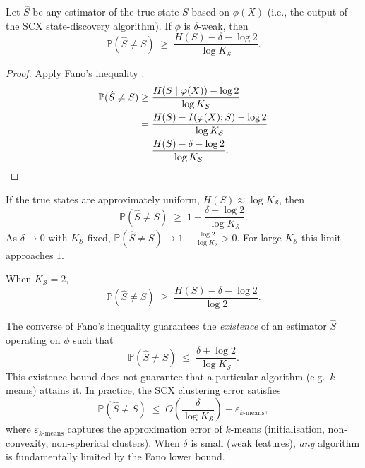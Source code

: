 \begin{lemma}
\label{lem:fano}
Let $\hat{S}$ be any estimator of the true state $S$ based on $\phi(X)$
(i.e., the output of the SCX state-discovery algorithm). If $\phi$ is
$\delta$-weak, then
\begin{equation}
\mathbb{P}(\hat{S} \neq S) \;\geq\;
\frac{H(S) - \delta - \log 2}{\log K_{\mathcal{S}}}.
\label{eq:fano-bound}
\end{equation}
\end{lemma}

\begin{proof}
Apply Fano's inequality \cite{fano1961,cover2006}:
\begin{align*}
\mathbb{P}(\hat{S} \neq S)
&\geq \frac{H(S \mid \phi(X)) - \log 2}{\log K_{\mathcal{S}}} \\
&= \frac{H(S) - I(\phi(X); S) - \log 2}{\log K_{\mathcal{S}}} \\
&= \frac{H(S) - \delta - \log 2}{\log K_{\mathcal{S}}}.
\qedhere
\end{align*}
\end{proof}

\begin{corollary}
\label{cor:fano-uniform}
If the true states are approximately uniform,
$H(S) \approx \log K_{\mathcal{S}}$, then
\[
\mathbb{P}(\hat{S} \neq S) \;\geq\; 1 - \frac{\delta + \log 2}{\log K_{\mathcal{S}}}.
\]
As $\delta \to 0$ with $K_{\mathcal{S}}$ fixed,
$\mathbb{P}(\hat{S} \neq S) \to 1 - \frac{\log 2}{\log K_{\mathcal{S}}} > 0$.
For large $K_{\mathcal{S}}$ this limit approaches $1$.
\end{corollary}

\begin{corollary}
\label{cor:fano-two-state}
When $K_{\mathcal{S}} = 2$,
\[
\mathbb{P}(\hat{S} \neq S) \;\geq\;
\frac{H(S) - \delta - \log 2}{\log 2}.
\]
\end{corollary}

\begin{remark}[Achievability]
\label{remark:fano-achievability}
The converse of Fano's inequality guarantees the \emph{existence} of an
estimator $\hat{S}$ operating on $\phi$ such that
\[
\mathbb{P}(\hat{S} \neq S) \;\leq\; \frac{\delta + \log 2}{\log K_{\mathcal{S}}}.
\]
This existence bound does not guarantee that a particular algorithm
(e.g.\ $k$-means) attains it. In practice, the SCX clustering error satisfies
\[
\mathbb{P}(\hat{S} \neq S) \;\leq\; O\!\left(\frac{\delta}{\log K_{\mathcal{S}}}\right)
+ \varepsilon_{k\text{-means}},
\]
where $\varepsilon_{k\text{-means}}$ captures the approximation error of
$k$-means (initialisation, non-convexity, non-spherical clusters). When
$\delta$ is small (weak features), \emph{any} algorithm is fundamentally
limited by the Fano lower bound.
\end{remark}

